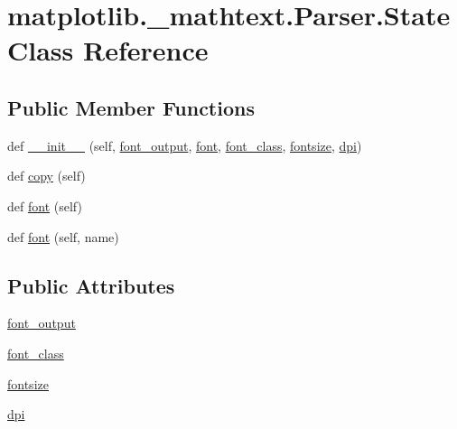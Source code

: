 \hypertarget{classmatplotlib_1_1__mathtext_1_1Parser_1_1State}{}\section{matplotlib.\+\_\+mathtext.\+Parser.\+State Class Reference}
\label{classmatplotlib_1_1__mathtext_1_1Parser_1_1State}
\subsection*{Public Member Functions}
\begin{DoxyCompactItemize}
\item 
def \hyperlink{classmatplotlib_1_1__mathtext_1_1Parser_1_1State_a772f69d4f31355d1e1041cbe8e299996}{\+\_\+\+\_\+init\+\_\+\+\_\+} (self, \hyperlink{classmatplotlib_1_1__mathtext_1_1Parser_1_1State_aa2f19eab597b46a62c20d324d7f576fd}{font\+\_\+output}, \hyperlink{classmatplotlib_1_1__mathtext_1_1Parser_1_1State_a62f404b3ae6c2d09d93bd9cfbeea6716}{font}, \hyperlink{classmatplotlib_1_1__mathtext_1_1Parser_1_1State_a1ef8bbb41eb4e2ae854084090a702dda}{font\+\_\+class}, \hyperlink{classmatplotlib_1_1__mathtext_1_1Parser_1_1State_af1bf502ad777150a07b257aeb562ca57}{fontsize}, \hyperlink{classmatplotlib_1_1__mathtext_1_1Parser_1_1State_a640d3d8e443604fbf1b55cfc7314545b}{dpi})
\item 
def \hyperlink{classmatplotlib_1_1__mathtext_1_1Parser_1_1State_a94c9530332a0b950c6c8ed29235eed24}{copy} (self)
\item 
def \hyperlink{classmatplotlib_1_1__mathtext_1_1Parser_1_1State_a62f404b3ae6c2d09d93bd9cfbeea6716}{font} (self)
\item 
def \hyperlink{classmatplotlib_1_1__mathtext_1_1Parser_1_1State_a4460823e2d09d019041a442aa4b33c61}{font} (self, name)
\end{DoxyCompactItemize}
\subsection*{Public Attributes}
\begin{DoxyCompactItemize}
\item 
\hyperlink{classmatplotlib_1_1__mathtext_1_1Parser_1_1State_aa2f19eab597b46a62c20d324d7f576fd}{font\+\_\+output}
\item 
\hyperlink{classmatplotlib_1_1__mathtext_1_1Parser_1_1State_a1ef8bbb41eb4e2ae854084090a702dda}{font\+\_\+class}
\item 
\hyperlink{classmatplotlib_1_1__mathtext_1_1Parser_1_1State_af1bf502ad777150a07b257aeb562ca57}{fontsize}
\item 
\hyperlink{classmatplotlib_1_1__mathtext_1_1Parser_1_1State_a640d3d8e443604fbf1b55cfc7314545b}{dpi}
\end{DoxyCompactItemize}


